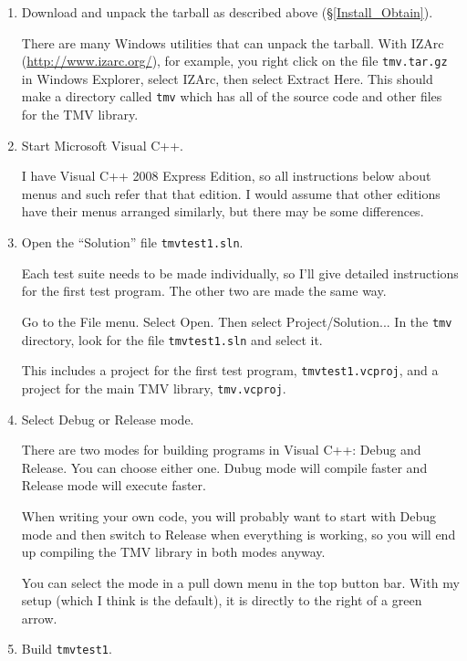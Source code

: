 \begin{enumerate}
\item Download and unpack the tarball as described above (\S\ref{Install_Obtain}).

There are many Windows utilities that can unpack the
tarball.  With IZArc (\url{http://www.izarc.org/}), for example, you right click on the file 
\texttt{tmv\tmvversion.tar.gz}
in Windows Explorer, select IZArc, then select Extract Here.  This should make a directory
called \texttt{tmv\tmvversion} which has all of the source code and other files for the TMV library.

\item
Start Microsoft Visual C++.  

I have Visual C++ 2008 Express Edition, so all instructions below
about menus and such refer that that edition.  I would assume that other editions have their 
menus arranged similarly, but there may be some differences.

\item
Open the ``Solution'' file \texttt{tmvtest1.sln}.

Each test suite needs to be made individually, so I'll give detailed instructions for the first
test program.  The other two are made the same way.

Go to the File menu.  Select Open.  Then select Project/Solution...
In the \texttt{tmv\tmvversion} directory, look for the file
\texttt{tmvtest1.sln} and select it.  

This includes a project for the first test program, \texttt{tmvtest1.vcproj}, and a project for
the main TMV library, \texttt{tmv.vcproj}.

\item
Select Debug or Release mode.

There are two modes for building programs in Visual C++: Debug and Release.  
You can choose either one.  Dubug mode will compile faster and 
Release mode will execute faster.  

When writing 
your own code, you will probably want to start with Debug mode and then switch to Release
when everything is working, so you will end up compiling the TMV library in both modes anyway.

You can select the mode in a pull down menu in the top button bar.  With my setup
(which I think is the default), it is directly to the right of a green arrow.

\item
Build \texttt{tmvtest1}.


\end{enumerate}
